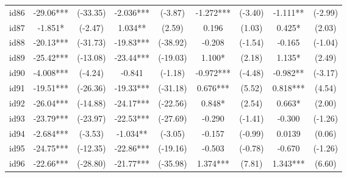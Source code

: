 \documentclass[entropy,article,submit,moreauthors,LaTeX and dvi2pdf]{Definitions/mdpi}
\begin{document}
\begin{center}
\begin{longtable}{ccccccccc}
id86                                          & -29.06***     & (-33.35)      & -2.036***       & (-3.87)          & -1.272***         & (-3.40)           & -1.111**          & (-2.99)           \\
id87                                          & -1.851*       & (-2.47)       & 1.034**         & (2.59)           & 0.196             & (1.03)            & 0.425*            & (2.03)            \\
id88                                          & -20.13***     & (-31.73)      & -19.83***       & (-38.92)         & -0.208            & (-1.54)           & -0.165            & (-1.04)           \\
id89                                          & -25.42***     & (-13.08)      & -23.44***       & (-19.03)         & 1.100*            & (2.18)            & 1.135*            & (2.49)            \\
id90                                          & -4.008***     & (-4.24)       & -0.841          & (-1.18)          & -0.972***         & (-4.48)           & -0.982**          & (-3.17)           \\
id91                                          & -19.51***     & (-26.36)      & -19.33***       & (-31.18)         & 0.676***          & (5.52)            & 0.818***          & (4.54)            \\
id92                                          & -26.04***     & (-14.88)      & -24.17***       & (-22.56)         & 0.848*            & (2.54)            & 0.663*            & (2.00)            \\
id93                                          & -23.79***     & (-23.97)      & -22.53***       & (-27.69)         & -0.290            & (-1.41)           & -0.300            & (-1.26)           \\
id94                                          & -2.684***     & (-3.53)       & -1.034**        & (-3.05)          & -0.157            & (-0.99)           & 0.0139            & (0.06)            \\
id95                                          & -24.75***     & (-12.35)      & -22.86***       & (-19.16)         & -0.503            & (-0.78)           & -0.670            & (-1.26)           \\
id96                                          & -22.66***     & (-28.80)      & -21.77***       & (-35.98)         & 1.374***          & (7.81)            & 1.343***          & (6.60)            \\

\end{longtable}
\end{center}
\end{document}

